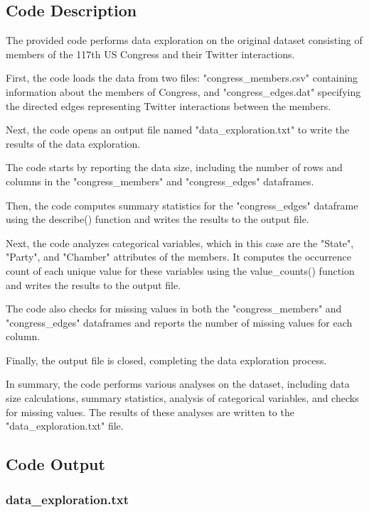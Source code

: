 \documentclass[11pt]{article}
\begin{document}
\subsection{Code Description}

The provided code performs data exploration on the original dataset consisting of members of the 117th US Congress and their Twitter interactions. 

First, the code loads the data from two files: "congress\_members.csv" containing information about the members of Congress, and "congress\_edges.dat" specifying the directed edges representing Twitter interactions between the members.

Next, the code opens an output file named "data\_exploration.txt" to write the results of the data exploration.

The code starts by reporting the data size, including the number of rows and columns in the "congress\_members" and "congress\_edges" dataframes.

Then, the code computes summary statistics for the "congress\_edges" dataframe using the describe() function and writes the results to the output file.

Next, the code analyzes categorical variables, which in this case are the "State", "Party", and "Chamber" attributes of the members. It computes the occurrence count of each unique value for these variables using the value\_counts() function and writes the results to the output file.

The code also checks for missing values in both the "congress\_members" and "congress\_edges" dataframes and reports the number of missing values for each column.

Finally, the output file is closed, completing the data exploration process.

In summary, the code performs various analyses on the dataset, including data size calculations, summary statistics, analysis of categorical variables, and checks for missing values. The results of these analyses are written to the "data\_exploration.txt" file.

\subsection{Code Output}

\subsubsection*{data\_exploration.txt}
\end{document}
